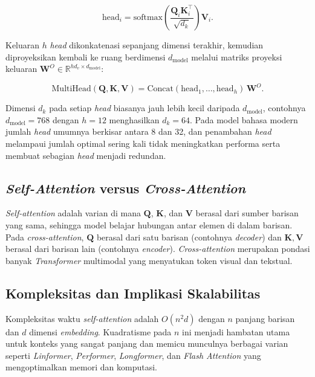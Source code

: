 \begin{equation}
    \text{head}_i = \text{softmax}\!\left( \frac{\mathbf{Q}_i \mathbf{K}_i^\top}{\sqrt{d_k}} \right) \mathbf{V}_i.
    \label{eq:mha_head}
\end{equation}

Keluaran $h$ \textit{head} dikonkatenasi sepanjang dimensi terakhir, kemudian diproyeksikan kembali ke ruang berdimensi $d_{\text{model}}$ melalui matriks proyeksi keluaran $\mathbf{W}^O \in \mathbb{R}^{h d_v \times d_{\text{model}}}$:

\begin{equation}
    \text{MultiHead}(\mathbf{Q}, \mathbf{K}, \mathbf{V}) = \text{Concat}(\text{head}_1, \dots, \text{head}_h) \, \mathbf{W}^O.
    \label{eq:multihead}
\end{equation}

Dimensi $d_k$ pada setiap \textit{head} biasanya jauh lebih kecil daripada $d_{\text{model}}$, contohnya $d_{\text{model}} = 768$ dengan $h = 12$ menghasilkan $d_k = 64$. Pada model bahasa modern jumlah \textit{head} umumnya berkisar antara 8 dan 32, dan penambahan \textit{head} melampaui jumlah optimal sering kali tidak meningkatkan performa serta membuat sebagian \textit{head} menjadi redundan.

\subsection{\textit{Self-Attention} versus \textit{Cross-Attention}}

\textit{Self-attention} adalah varian di mana $\mathbf{Q}$, $\mathbf{K}$, dan $\mathbf{V}$ berasal dari sumber barisan yang sama, sehingga model belajar hubungan antar elemen di dalam barisan. Pada \textit{cross-attention}, $\mathbf{Q}$ berasal dari satu barisan (contohnya \textit{decoder}) dan $\mathbf{K}, \mathbf{V}$ berasal dari barisan lain (contohnya \textit{encoder}). \textit{Cross-attention} merupakan pondasi banyak \textit{Transformer} multimodal yang menyatukan token visual dan tekstual.

\subsection{Kompleksitas dan Implikasi Skalabilitas}

Kompleksitas waktu \textit{self-attention} adalah $O(n^2 d)$ dengan $n$ panjang barisan dan $d$ dimensi \textit{embedding}. Kuadratisme pada $n$ ini menjadi hambatan utama untuk konteks yang sangat panjang dan memicu munculnya berbagai varian seperti \textit{Linformer}, \textit{Performer}, \textit{Longformer}, dan \textit{Flash Attention} yang mengoptimalkan memori dan komputasi.


